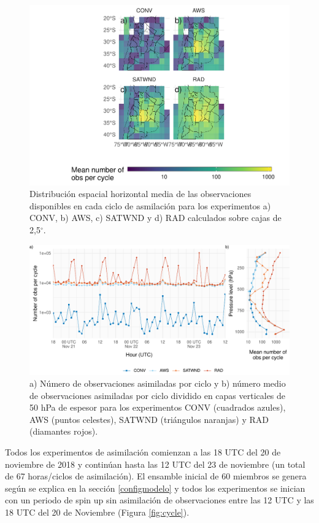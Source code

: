 \documentclass[12pt,oneside,a4paper]{reedthesis}
\begin{document}
\begin{figure}
\includegraphics{thesis_files/figure-latex/obs-horizontal-1} \caption{Distribución espacial horizontal media de las observaciones disponibles en cada ciclo de asmilación para los experimentos a) CONV, b) AWS, c) SATWND y d) RAD calculados sobre cajas de 2,5\(^{\circ}\).}\label{fig:obs-horizontal}
\end{figure}

\begin{figure}
\includegraphics{thesis_files/figure-latex/obs-cycle-1} \caption{a) Número de observaciones asimiladas por ciclo y b) número medio de observaciones asimiladas por ciclo dividido en capas verticales de 50 hPa de espesor para los experimentos CONV (cuadrados azules), AWS (puntos celestes), SATWND (triángulos naranjas) y RAD (diamantes rojos).}\label{fig:obs-cycle}
\end{figure}
Todos los experimentos de asimilación comienzan a las 18 UTC del 20 de noviembre de 2018 y continúan hasta las 12 UTC del 23 de noviembre (un total de 67 horas/ciclos de asimilación). El ensamble inicial de 60 miembros se genera según se explica en la sección \ref{configmodelo} y todos los experimentos se inician con un periodo de spin up sin asimilación de observaciones entre las 12 UTC y las 18 UTC del 20 de Noviembre (Figura \ref{fig:cycle}).
\end{document}
